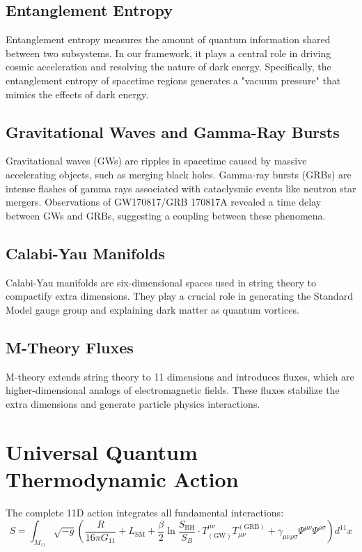\documentclass[12pt,a4paper]{article}
\begin{document}
\subsection{Entanglement Entropy}
Entanglement entropy measures the amount of quantum information shared between two subsystems. In our framework, it plays a central role in driving cosmic acceleration and resolving the nature of dark energy. Specifically, the entanglement entropy of spacetime regions generates a "vacuum pressure" that mimics the effects of dark energy.

\subsection{Gravitational Waves and Gamma-Ray Bursts}
Gravitational waves (GWs) are ripples in spacetime caused by massive accelerating objects, such as merging black holes. Gamma-ray bursts (GRBs) are intense flashes of gamma rays associated with cataclysmic events like neutron star mergers. Observations of GW170817/GRB 170817A revealed a time delay between GWs and GRBs, suggesting a coupling between these phenomena.

\subsection{Calabi-Yau Manifolds}
Calabi-Yau manifolds are six-dimensional spaces used in string theory to compactify extra dimensions. They play a crucial role in generating the Standard Model gauge group and explaining dark matter as quantum vortices.

\subsection{M-Theory Fluxes}
M-theory extends string theory to 11 dimensions and introduces fluxes, which are higher-dimensional analogs of electromagnetic fields. These fluxes stabilize the extra dimensions and generate particle physics interactions.

\section{Universal Quantum Thermodynamic Action}
The complete 11D action integrates all fundamental interactions:
\[
S = \int_{M_{11}} \sqrt{-g} \left( \frac{R}{16\pi G_{11}} + L_{\text{SM}} + \frac{\beta}{2} \ln \frac{S_{\text{BH}}}{S_B} \cdot T^{\mu\nu}_{(\text{GW})} T_{\mu\nu}^{(\text{GRB})} + \gamma_{\mu\nu\rho\sigma} \Psi^{\mu\nu} \Psi^{\rho\sigma} \right) d^{11}x
\]
\end{document}
